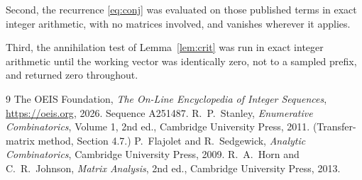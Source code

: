 \documentclass[11pt,a4paper]{article}
\theoremstyle{plain}
\theoremstyle{definition}
\begin{document}
Second, the recurrence \eqref{eq:conj} was evaluated on those published terms in exact
integer arithmetic, with no matrices involved, and vanishes wherever it applies.

Third, the annihilation test of Lemma~\ref{lem:crit} was run in exact integer arithmetic
until the working vector was identically zero, not to a sampled prefix, and returned zero
throughout.

\begin{thebibliography}{9}
 The OEIS Foundation, \emph{The On-Line Encyclopedia of Integer
Sequences}, \url{https://oeis.org}, 2026. Sequence A251487.
 R.~P.~Stanley, \emph{Enumerative Combinatorics}, Volume 1, 2nd ed.,
Cambridge University Press, 2011. (Transfer-matrix method, Section 4.7.)
 P.~Flajolet and R.~Sedgewick, \emph{Analytic Combinatorics}, Cambridge
University Press, 2009.
 R.~A.~Horn and C.~R.~Johnson, \emph{Matrix Analysis}, 2nd ed., Cambridge
University Press, 2013.
\end{thebibliography}
\end{document}
